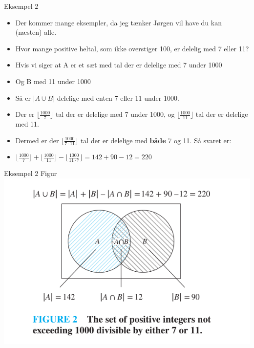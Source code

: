 \documentclass{beamer}
\begin{document}
\begin{frame}{Eksempel 2}
   \begin{itemize}
       \item<1-> Der kommer mange eksempler, da jeg tænker Jørgen vil have du kan (næsten) alle.
       \item<1-> Hvor mange positive heltal, som ikke overstiger 100, er delelig med 7 eller 11?
       \item<2-> Hvis vi siger at A er et sæt med tal der er delelige med 7 under 1000
       \item<2-> Og B med 11 under 1000
       \item<2-> Så er $|A \cup B|$ delelige med enten 7 eller 11 under 1000.
       \item<3-> Der er $\lfloor \frac{1000}{7} \rfloor$ tal der er delelige med 7 under 1000, og $\lfloor \frac{1000}{11} \rfloor$ tal der er delelige med 11. 
       \item<3-> Dermed er der $\lfloor\frac{1000}{7\cdot11}\rfloor$ tal der er delelige med \textbf{både} 7 og 11. Så svaret er:
       \item<4-> $\lfloor \frac{1000}{7} \rfloor + \lfloor \frac{1000}{11} \rfloor - \lfloor \frac{1000}{11\cdot7} \rfloor = 142+90-12=220 $
   \end{itemize} 
\end{frame}

\begin{frame}{Eksempel 2 Figur}
   \includegraphics[scale=0.8]{81fig2.png} 
\end{frame}
\end{document}
